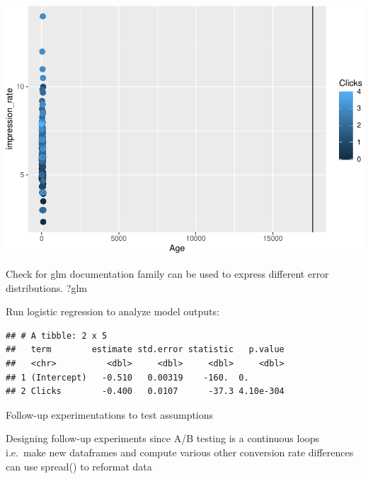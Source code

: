 \documentclass[]{book}
\newenvironment{Shaded}{\begin{snugshade}}{\end{snugshade}}
\newcommand{\DataTypeTok}[1]{\textcolor[rgb]{0.13,0.29,0.53}{#1}}
\newcommand{\KeywordTok}[1]{\textcolor[rgb]{0.13,0.29,0.53}{\textbf{#1}}}
\newcommand{\NormalTok}[1]{#1}
\newcommand{\OperatorTok}[1]{\textcolor[rgb]{0.81,0.36,0.00}{\textbf{#1}}}
\newcommand{\StringTok}[1]{\textcolor[rgb]{0.31,0.60,0.02}{#1}}
\begin{document}
\includegraphics{code4stem_files/figure-latex/plot clicks-1.pdf}

Check for glm documentation
family can be used to express different error distributions.
?glm

Run logistic regression to analyze model outputs:

\begin{Shaded}
\end{Shaded}

\begin{verbatim}
## # A tibble: 2 x 5
##   term        estimate std.error statistic   p.value
##   <chr>          <dbl>     <dbl>     <dbl>     <dbl>
## 1 (Intercept)   -0.510   0.00319    -160.  0.       
## 2 Clicks        -0.400   0.0107      -37.3 4.10e-304
\end{verbatim}

Follow-up experimentations to test assumptions

Designing follow-up experiments since A/B testing is a continuous loops
i.e.~make new dataframes and compute various other conversion rate differences
can use spread() to reformat data
\end{document}
